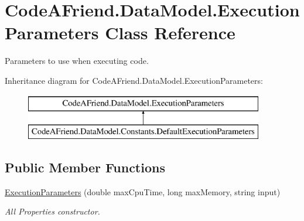 \hypertarget{class_code_a_friend_1_1_data_model_1_1_execution_parameters}{}\section{Code\+A\+Friend.\+Data\+Model.\+Execution\+Parameters Class Reference}
\label{class_code_a_friend_1_1_data_model_1_1_execution_parameters}


Parameters to use when executing code.  


Inheritance diagram for Code\+A\+Friend.\+Data\+Model.\+Execution\+Parameters\+:\begin{figure}[H]
\begin{center}
\leavevmode
\includegraphics[height=2.000000cm]{class_code_a_friend_1_1_data_model_1_1_execution_parameters}
\end{center}
\end{figure}
\subsection*{Public Member Functions}
\begin{DoxyCompactItemize}
\item 
\mbox{\hyperlink{class_code_a_friend_1_1_data_model_1_1_execution_parameters_ad64d2dbe0d229005a3ca8ec620525cdf}{Execution\+Parameters}} (double max\+Cpu\+Time, long max\+Memory, string input)
\begin{DoxyCompactList}\small\item\em All Properties constructor. \end{DoxyCompactList}\end{DoxyCompactItemize}

